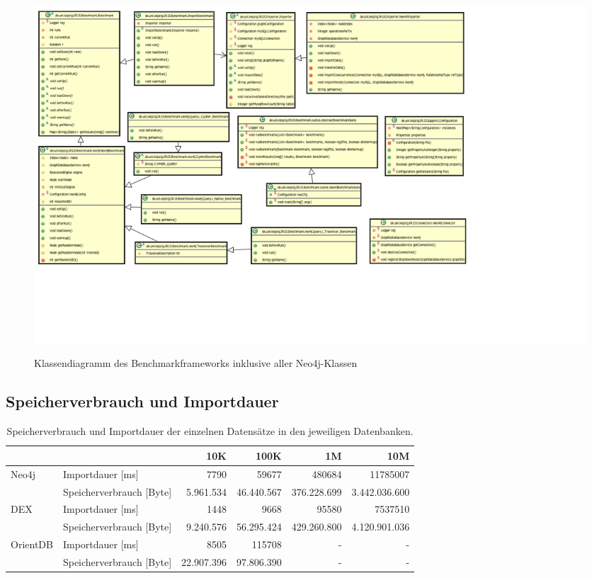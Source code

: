 \documentclass[11pt, a4paper, oneside]{article} %
\begin{document}
\begin{appendix}
\begin{landscape} 
	\newpage
	\thispagestyle{empty}
	
	\begin{figure}[ht]
			\centering
			\caption{Klassendiagramm des Benchmarkframeworks inklusive aller Neo4j-Klassen}
			\includegraphics[width=27cm]{pics/class_diagramm_incl_neo4j}
			\label{fig:class_diagramm_neo4j}
	\end{figure}
\end{landscape}

\subsection{Speicherverbrauch und Importdauer}
\label{anh:mem_time}

\begin{table}[ht]
\begin{tabular}{|l|l|r|r|r|r|}
\hline
& & 10K & 100K & 1M & 10M \\
\hline
\hline
\multirow{2}{*}{Neo4j} & Importdauer [ms] & 7790 & 59677 & 480684 & 11785007 \\
\cline{2-6}
 & Speicherverbrauch [Byte] & 5.961.534 & 46.440.567 & 376.228.699 & 3.442.036.600 \\
\hline
\multirow{2}{*}{DEX} & Importdauer [ms] & 1448 & 9668 & 95580 & 7537510 \\
\cline{2-6}
 & Speicherverbrauch [Byte] & 9.240.576 & 56.295.424 & 429.260.800 & 4.120.901.036 \\
\hline
\multirow{2}{*}{OrientDB} & Importdauer [ms] & 8505 & 115708 & - & - \\
\cline{2-6}
 & Speicherverbrauch [Byte] & 22.907.396 & 97.806.390 & - & - \\
\hline
\end{tabular}
\caption{Speicherverbrauch und Importdauer der einzelnen Datensätze in den jeweiligen Datenbanken.}
\label{tab:mem_time}
\end{table}
\end{appendix}
\end{document}

